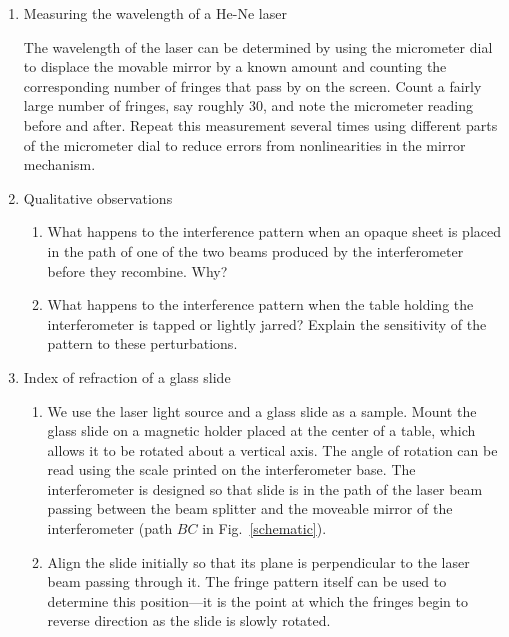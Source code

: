 \begin{enumerate}
\item \label{proc:lambda} Measuring the wavelength of a He-Ne laser

The wavelength of the laser can be determined by using the micrometer
dial to displace the movable mirror by a known amount and counting
the corresponding number of fringes that pass by on the screen.
Count a fairly large number of fringes, say roughly 30, and note the
micrometer reading before and after.  Repeat this measurement several
times using different parts of the micrometer dial to reduce errors from
nonlinearities in the mirror mechanism.

\item Qualitative observations

\begin{enumerate}
\item What happens to the interference pattern when an opaque sheet 
is placed in the path of one of the two beams produced by the 
interferometer before they recombine. Why?

\item What happens to the interference pattern when the table holding 
the interferometer is tapped or lightly jarred? Explain the sensitivity 
of the pattern to these perturbations.
\end{enumerate}

\item Index of refraction of a glass slide 

\begin{enumerate}
\item We use the laser light source and a glass slide as a sample.
Mount the glass slide on a magnetic holder placed at the center of a
table, which allows it to be rotated about a vertical axis.  The angle of
rotation can be read using the scale printed on the interferometer base.
The interferometer is designed so that slide is in the path of the laser
beam passing between the beam splitter and the moveable mirror of the
interferometer (path $BC$ in Fig.~\ref{schematic}).

\item Align the slide initially so that its plane is perpendicular to the laser
  beam passing through it. The fringe pattern itself can be used to determine
  this position---it is the point at which the fringes begin to reverse
  direction as the slide is slowly rotated.


\end{enumerate}
\end{enumerate}
